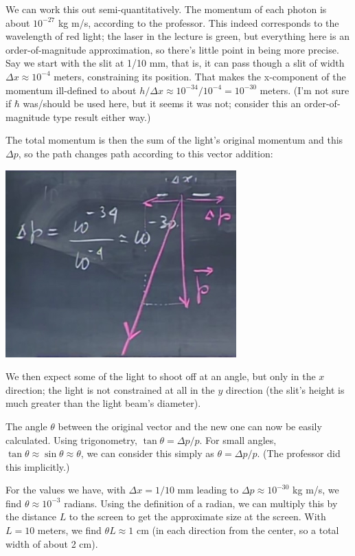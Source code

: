 \documentclass[8.01x]{subfiles}
\begin{document}
We can work this out semi-quantitatively. The momentum of each photon is about $10^{-27}$ kg m/s, according to the professor. This indeed corresponds to the wavelength of red light; the laser in the lecture is green, but everything here is an order-of-magnitude approximation, so there's little point in being more precise.\\
Say we start with the slit at 1/10 mm, that is, it can pass though a slit of width $\Delta x \approx 10^{-4}$ meters, constraining its position. That makes the x-component of the momentum ill-defined to about $h/\Delta x \approx 10^{-34} / 10^{-4} = 10^{-30}$ meters. (I'm not sure if $\hbar$ was/should be used here, but it seems it was not; consider this an order-of-magnitude type result either way.)

The total momentum is then the sum of the light's original momentum and this $\Delta p$, so the path changes path according to this vector addition:

\begin{center}
\includegraphics[scale=0.65]{Graphics/lec34_momentum_uncertainty}
\end{center}

We then expect some of the light to shoot off at an angle, but only in the $x$ direction; the light is not constrained at all in the $y$ direction (the slit's height is much greater than the light beam's diameter).

The angle $\theta$ between the original vector and the new one can now be easily calculated. Using trigonometry, $\tan \theta = \Delta p / p$. For small angles, $\tan \theta \approx \sin \theta \approx \theta$, we can consider this simply as $\theta = \Delta p / p$. (The professor did this implicitly.)

For the values we have, with $\Delta x = 1/10$ mm leading to $\Delta p \approx 10^{-30}$ kg m/s, we find $\theta \approx 10^{-3}$ radians. Using the definition of a radian, we can multiply this by the distance $L$ to the screen to get the approximate size at the screen. With $L = 10$ meters, we find $\theta L \approx 1$ cm (in each direction from the center, so a total width of about 2 cm).
\end{document}
